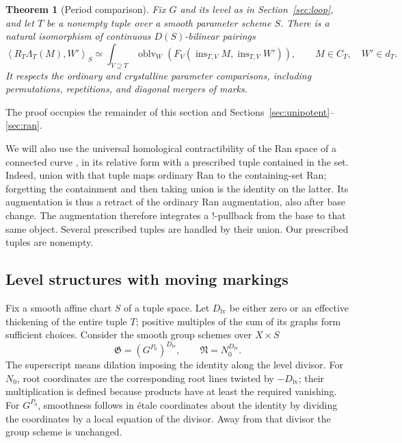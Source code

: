 \documentclass[11pt]{article}
\numberwithin{equation}{section}
\newtheorem{theorem}{Theorem}[section]
\theoremstyle{definition}
\theoremstyle{remark}
\begin{document}
\begin{theorem}[Period comparison]\label{loc:period-comparison}
Fix $G$ and its level as in Section~\ref{sec:loop}, and let $T$ be a
nonempty tuple over a smooth parameter scheme $S$.  There is a natural
isomorphism of continuous $D(S)$-bilinear pairings
\begin{equation}\label{eq:T1}
 \left\langle R_T\Lambda_T(M),W'\right\rangle_S
 \simeq
 \int_{V\supseteq T}
 \operatorname{oblv}_W\!\left(
 F_V(\operatorname{ins}_{T,V}M,
             \operatorname{ins}_{T,V}W')\right),
 \qquad M\in C_T,\quad W'\in d_T.
\end{equation}
It respects the ordinary and crystalline parameter comparisons,
including permutations, repetitions, and diagonal mergers of marks.
\end{theorem}

The proof occupies the remainder of this section and
Sections~\ref{sec:unipotent}--\ref{sec:ran}.

We will also use the universal homological contractibility of the Ran
space of a connected curve \cite{GaitsgoryContractibility}, in its
relative form with a prescribed tuple contained in the set.  Indeed,
union with that tuple maps ordinary Ran to the containing-set Ran;
forgetting the containment and then taking union is the identity on the
latter.  Its augmentation is thus a retract of the ordinary Ran
augmentation, also after base change.  The augmentation therefore
integrates a $!$-pullback from the base to that same object.  Several
prescribed tuples are handled by their union.  Our prescribed tuples
are nonempty.

\subsection{Level structures with moving markings}

Fix a smooth affine chart $S$ of a tuple space.  Let $D_{\mathrm{lv}}$
be either zero or an effective thickening of the entire tuple $T$;
positive multiples of the sum of its graphs form sufficient choices.
Consider the smooth group schemes over $X\times S$
\[
 \mathfrak G=(G^{P_0})^{D_{\mathrm{lv}}},\qquad
 \mathfrak N=N_0^{D_{\mathrm{lv}}}.
\]
The superscript means dilation imposing the identity along the level
divisor.  For $N_0$, root coordinates are the corresponding root lines
twisted by $-D_{\mathrm{lv}}$; their multiplication is defined because
products have at least the required vanishing.  For $G^{P_0}$,
smoothness follows in \'etale coordinates about the identity by
dividing the coordinates by a local equation of the divisor.  Away from
that divisor the group scheme is unchanged.
\end{document}
